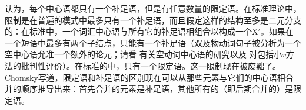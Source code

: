 \mbox{} \citet[]{Chomsky2008a}认为，每个中心语都只有一个补足语，但是有任意数量的限定语。在标准\xbartc 理论中，限制是在普遍的\xbar 模式中最多只有一个补足语，而且假定这样的结构至多是二元分支的：在标准\xbartc 中，一个词汇中心语与所有它的补足语相组合以构成一个X$'$。如果在一个短语中最多有两个子结点，只能有一个补足语（双及物动词句子被分析为一个空中心语允准一个额外的论元；请看 有关空动词中心语的研究以及 对包括小\emph{v}方法的批判性评价）。在标准的\xbartc 中，只有一个限定语。这一限制现在被废黜了。Chomsky写道，限定语和补足语的区别现在可以从那些元素与它们的中心语相合并的顺序推导出来：首先合并的元素是补足语，其他所有的（即后期合并的）是限定语。

